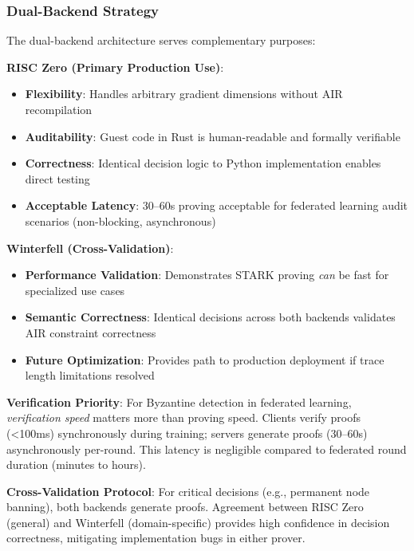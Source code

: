 \subsubsection{Dual-Backend Strategy}

The dual-backend architecture serves complementary purposes:

\textbf{RISC Zero (Primary Production Use)}:
\begin{itemize}
    \item \textbf{Flexibility}: Handles arbitrary gradient dimensions without AIR recompilation
    \item \textbf{Auditability}: Guest code in Rust is human-readable and formally verifiable
    \item \textbf{Correctness}: Identical decision logic to Python implementation enables direct testing
    \item \textbf{Acceptable Latency}: 30--60s proving acceptable for federated learning audit scenarios (non-blocking, asynchronous)
\end{itemize}

\textbf{Winterfell (Cross-Validation)}:
\begin{itemize}
    \item \textbf{Performance Validation}: Demonstrates STARK proving \textit{can} be fast for specialized use cases
    \item \textbf{Semantic Correctness}: Identical decisions across both backends validates AIR constraint correctness
    \item \textbf{Future Optimization}: Provides path to production deployment if trace length limitations resolved
\end{itemize}

\textbf{Verification Priority}: For Byzantine detection in federated learning, \textit{verification speed} matters more than proving speed. Clients verify proofs (<100ms) synchronously during training; servers generate proofs (30--60s) asynchronously per-round. This latency is negligible compared to federated round duration (minutes to hours).

\textbf{Cross-Validation Protocol}: For critical decisions (e.g., permanent node banning), both backends generate proofs. Agreement between RISC Zero (general) and Winterfell (domain-specific) provides high confidence in decision correctness, mitigating implementation bugs in either prover.
